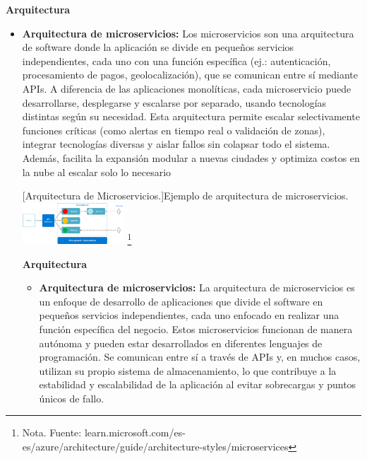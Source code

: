 \vspace{5mm}
\textbf{Arquitectura} 

\begin{itemize}
    \item\textbf{Arquitectura de microservicios: }Los microservicios son una arquitectura de software donde la aplicación se divide en pequeños servicios independientes, cada uno con una función específica (ej.: autenticación, procesamiento de pagos, geolocalización), que se comunican entre sí mediante APIs. A diferencia de las aplicaciones monolíticas, cada microservicio puede desarrollarse, desplegarse y escalarse por separado, usando tecnologías distintas según su necesidad.
    Esta arquitectura permite escalar selectivamente funciones críticas (como alertas en tiempo real o validación de zonas), integrar tecnologías diversas y aislar fallos sin colapsar todo el sistema. Además, facilita la expansión modular a nuevas ciudades y optimiza costos en la nube al escalar solo lo necesario
    \vspace{2mm}
    \begin{minipage}{0.9\textwidth}
        \centering
        [{Arquitectura de Microservicios.}]{Ejemplo de arquitectura de microservicios.}
        \label{microservicios}
        \includegraphics[width=0.3\textwidth]{Content/Images/microservices-logical.png}
        \footnote{Nota. \textup{Fuente: learn.microsoft.com/es-es/azure/architecture/guide/architecture-styles/microservices}}
    \end{minipage}


{\color{red}

\textbf{Arquitectura} 
\begin{itemize}
    
    \item \textbf{Arquitectura de microservicios: } La arquitectura de microservicios es un enfoque de desarrollo de aplicaciones que divide el software en pequeños servicios independientes, cada uno enfocado en realizar una función específica del negocio. Estos microservicios funcionan de manera autónoma y pueden estar desarrollados en diferentes lenguajes de programación. Se comunican entre sí a través de APIs y, en muchos casos, utilizan su propio sistema de almacenamiento, lo que contribuye a la estabilidad y escalabilidad de la aplicación al evitar sobrecargas y puntos únicos de fallo.
    

\end{itemize}}
\end{itemize}
